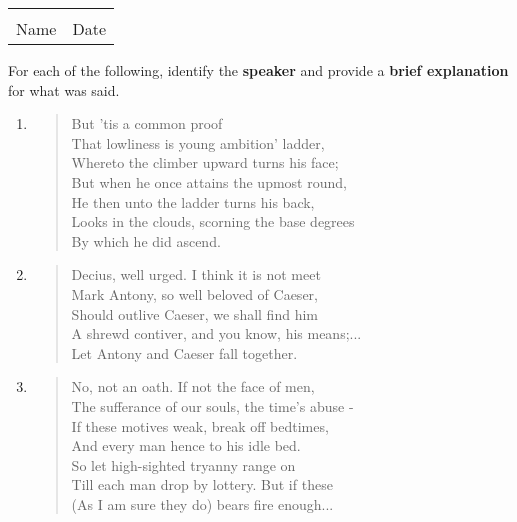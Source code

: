 \documentclass[12pt]{article} %
\begin{document}
  \vspace*{0.4cm}

	\begin{center}
	\noindent\begin{tabular}{ll}
		\makebox[3in]{\hrulefill} & \makebox[3in]{\hrulefill}\\
		Name & Date\\[8ex]%
	\end{tabular}
	\end{center}
	\newpage


\begin{qstn}
  For each of the following, identify the \textbf{speaker} and provide a \textbf{brief explanation} for what was said.

  \begin{enumerate}
    \item
        \begin{verse}
          But 'tis a common proof \\
          That lowliness is young ambition' ladder,\\
          Whereto the climber upward turns his face; \\
          But when he once attains the upmost round,\\
          He then unto the ladder turns his back, \\
          Looks in the clouds, scorning the base degrees \\
          By which he did ascend.
        \end{verse}
       \vspace*{7cm}
    \item
       \begin{verse}
         Decius, well urged. I think it is not meet \\
         Mark Antony, so well beloved of Caeser,\\
         Should outlive Caeser, we shall find him \\
         A shrewd contiver, and you know, his means;...\\
         Let Antony and Caeser fall together.
       \end{verse}
          \newpage

    \item
        \begin{verse}
          No, not an oath. If not the face of men, \\
          The sufferance of our souls, the time's abuse - \\
          If these motives weak, break off bedtimes, \\
          And every man hence to his idle bed. \\
          So let high-sighted tryanny range on \\
          Till each man drop by lottery. But if these \\
          (As I am sure they do) bears fire enough...
        \end{verse}
       \vspace*{11cm}


\end{enumerate}
\end{qstn}
\end{document}
